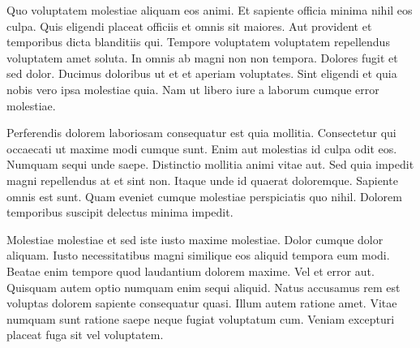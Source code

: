 Quo voluptatem molestiae aliquam eos animi. Et sapiente officia minima nihil eos culpa. Quis eligendi placeat officiis et omnis sit maiores. Aut provident et temporibus dicta blanditiis qui. Tempore voluptatem voluptatem repellendus voluptatem amet soluta. In omnis ab magni non non tempora. Dolores fugit et sed dolor. Ducimus doloribus ut et et aperiam voluptates. Sint eligendi et quia nobis vero ipsa molestiae quia. Nam ut libero iure a laborum cumque error molestiae.

Perferendis dolorem laboriosam consequatur est quia mollitia. Consectetur qui occaecati ut maxime modi cumque sunt. Enim aut molestias id culpa odit eos. Numquam sequi unde saepe. Distinctio mollitia animi vitae aut. Sed quia impedit magni repellendus at et sint non. Itaque unde id quaerat doloremque. Sapiente omnis est sunt. Quam eveniet cumque molestiae perspiciatis quo nihil. Dolorem temporibus suscipit delectus minima impedit.

Molestiae molestiae et sed iste iusto maxime molestiae. Dolor cumque dolor aliquam. Iusto necessitatibus magni similique eos aliquid tempora eum modi. Beatae enim tempore quod laudantium dolorem maxime. Vel et error aut. Quisquam autem optio numquam enim sequi aliquid. Natus accusamus rem est voluptas dolorem sapiente consequatur quasi. Illum autem ratione amet. Vitae numquam sunt ratione saepe neque fugiat voluptatum cum. Veniam excepturi placeat fuga sit vel voluptatem.
